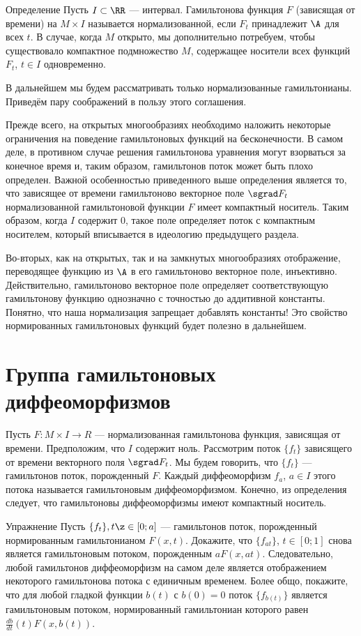 \begin{thm}{Определение}
Пусть $I \subset \RR$ --- интервал.
Гамильтонова функция $F$ (зависящая от времени) на $M \times I$ называется нормализованной, если $F_t$ принадлежит $\A$ для всех $t$.
В случае, когда $M$ открыто, мы дополнительно потребуем, чтобы существовало компактное подмножество $M$, содержащее носители всех функций $F_t$, $t \in I$ одновременно.
\end{thm}

В дальнейшем мы будем рассматривать только нормализованные гамильтонианы.
Приведём пару соображений в пользу этого соглашения.

Прежде всего, на открытых многообразиях необходимо наложить некоторые ограничения на поведение гамильтоновых функций на бесконечности.
В самом деле, в противном случае решения гамильтонова уравнения могут взорваться за конечное время и, таким образом, гамильтонов поток может быть плохо определен.
Важной особенностью приведенного выше определения является то, что зависящее от времени гамильтоново векторное поле $\sgrad F_t$ нормализованной гамильтоновой функции $F$ имеет компактный носитель.
Таким образом, когда $I$ содержит $0$, такое поле определяет поток с компактным носителем, который вписывается в идеологию предыдущего раздела.

Во-вторых, как на открытых, так и на замкнутых многообразиях отображение, переводящее функцию из $\A$ в его гамильтоново векторное поле, инъективно.
Действительно, гамильтоново векторное поле определяет соответствующую гамильтонову функцию однозначно с точностью до аддитивной константы.
Понятно, что наша нормализация запрещает добавлять константы!
Это свойство нормированных гамильтоновых функций будет полезно в дальнейшем.


\section{Группа гамильтоновых диффеоморфизмов}

Пусть $F: M \times I \to R$ --- нормализованная гамильтонова функция, зависящая от времени.
Предположим, что $I$ содержит ноль.
Рассмотрим поток $\{f_t\}$ зависящего от времени векторного поля $\sgrad F_t$.
Мы будем говорить, что $\{f_t\}$ --- гамильтонов поток, порожденный $F$.
Каждый диффеоморфизм $f_a$, $a \in I$ этого потока называется гамильтоновым диффеоморфизмом.
Конечно, из определения следует, что гамильтоновы диффеоморфизмы имеют компактный носитель.

\begin{thm}{Упражнение}\label{1.4.A}
Пусть $\{f_t\}, t \z\in [0; a]$ --- гамильтонов поток, порожденный нормированным гамильтонианом $ F (x, t)$.
Докажите, что $\{f_{at}\}$, $t \in [0; 1]$ снова является гамильтоновым потоком, порожденным $aF (x, at)$.
Следовательно, любой гамильтонов диффеоморфизм на самом деле является отображением некоторого гамильтонова потока с единичным временем.
Более общо, покажите, что для любой гладкой функции $b (t)$ с $b (0) = 0$ поток $\{f_{b (t)}\}$ является гамильтоновым потоком, нормированный гамильтониан которого равен $\tfrac{db}{dt} (t) F (x, b (t))$.
\end{thm}

